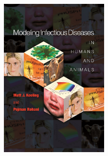 \documentclass[
  ignorenonframetext,
]{beamer}
\begin{document}
\begin{frame}
\begin{figure}

\begin{minipage}{0.50\linewidth}

\begin{figure}[H]

{\centering \includegraphics[width=0.6\textwidth,height=\textheight]{images/Rohani_and_Keeling.jpeg}

}


\end{figure}%

\end{minipage}%
%
\begin{minipage}{0.50\linewidth}

\begin{figure}[H]


\end{figure}
\end{minipage}
\end{figure}
\end{frame}
\end{document}
